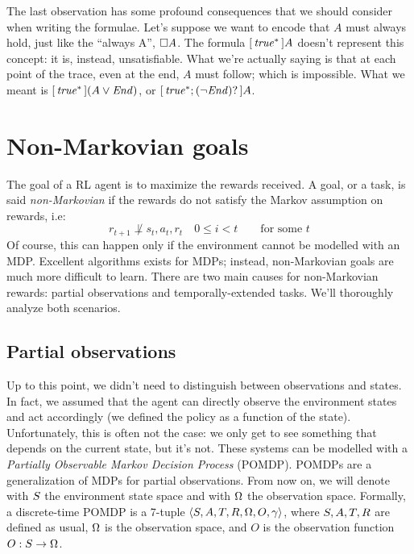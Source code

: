 The last observation has some profound consequences that we should consider
when writing the formulae. Let's suppose we want to encode that $A$ must
always hold, just like the \ltl{} ``always A'', $\square A$. The \ldl{}
formula ${[\, {\text{\textit{true}}^*} \,]A}$ doesn't represent this concept: it is, instead,
unsatisfiable. What we're actually saying is that at each point of the trace,
even at the end, $A$ must follow; which is impossible. What we meant is
${[\, {\text{\textit{true}}^*} \,](A \lor \text{\textit{End}})}$, or ${[\, {\text{\textit{true}}^*; (\neg \text{\textit{End}})?} \,]A}$.





\section{Non-Markovian goals}
\label{sec:non-markov}

The goal of a RL agent is to maximize the rewards received.  A goal, or a
task, is said \emph{non-Markovian} if the rewards do not satisfy the Markov
assumption on rewards, i.e:
\begin{equation}
	r_{t+1} \not\perp s_t, a_t, r_t \quad 0 \le i < t \qquad \text{for some $t$}
	\label{eq:markov-rewards}
\end{equation}
Of course, this can happen only if the environment cannot be modelled with an
MDP. Excellent algorithms exists for MDPs; instead, non-Markovian goals are
much more difficult to learn.  There are two main causes for non-Markovian
rewards: partial observations and temporally-extended tasks. We'll thoroughly
analyze both scenarios.


\subsection{Partial observations}

Up to this point, we didn't need to distinguish between observations and
states. In fact, we assumed that the agent can directly observe the
environment states and act accordingly (we defined the policy as a function of
the state). Unfortunately, this is often not the case: we only get to see
something that depends on the current state, but it's not. These systems can
be modelled with a \emph{Partially Observable Markov Decision Process}
(POMDP).  POMDPs are a generalization of MDPs for partial observations. From
now on, we will denote with $S$ the environment state space and with
$\Omega$ the observation space. Formally, a discrete-time POMDP is a 7-tuple
${\langle S, A, T, R, \Omega, O, \gamma \rangle}$, where $S, A,
T, R$ are defined as usual, $\Omega$ is the observation space, and $O$ is the
observation function ${O: S \to \Omega}$.

